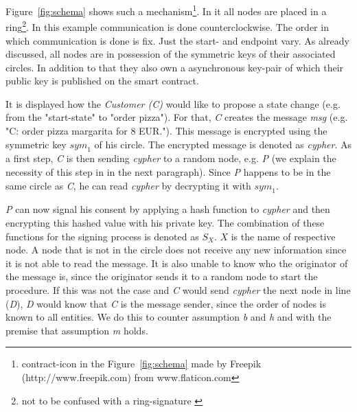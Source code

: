 \documentclass[runningheads]{llncs}
\newcommand{\comment}[1]{}
\newcommand{\ber}[1]{\textit{#1}}
\newcommand{\reffig}[1]{Figure~\ref{#1}}
\begin{document}
\reffig{fig:schema} shows such a mechanism\footnote{contract-icon in the \reffig{fig:schema} made by Freepik (http://www.freepik.com) from www.flaticon.com}. In it all nodes are placed in a ring\footnote{not to be confused with a ring-signature \cite{rivest2001leak}}. In this example communication is done counterclockwise. The order in which communication is done is fix. Just the start- and endpoint vary. As already discussed, all nodes are in possession of the symmetric keys of their associated circles. In addition to that they also own a asynchronous key-pair of which their public key is published on the smart contract.

It is displayed how the \ber{Customer (C)} would like to propose a state change (e.g. from the "start-state" to "order pizza"). For that, \ber{C} creates the message \ber{msg} (e.g. "C: order pizza margarita for 8 EUR."). This message is encrypted using the symmetric key ${sym}_1$ of his circle. The encrypted message is denoted as \ber{cypher}. As a first step, \ber{C} is then sending \ber{cypher} to a random node, e.g. \ber{P} (we explain the necessity of this step in in the next paragraph). Since \ber{P} happens to be in the same circle as \ber{C}, he can read \ber{cypher} by decrypting it with ${sym}_1$. 



\ber{P} can now signal his consent by applying a hash function to \ber{cypher} and then encrypting this hashed value with his private key. The combination of these functions for the signing process is denoted as $S_X$. $X$ is the name of respective node. A node that is not in the circle does not receive any new information since it is not able to read the message. It is also unable to know who the originator of the message is, since the originator sends it to a random node to start the procedure. If this was not the case and \ber{C} would send \ber{cypher} the next node in line (\ber{D}), \ber{D} would know that \ber{C} is the message sender, since the order of nodes is known to all entities. We do this to counter assumption \ber{b} and \ber{h} and with the premise that assumption \ber{m} holds.

\comment{
Furthermore, a node will also not be able to know how many other nodes already "agreed" to the message, because we "nest" signatures instead of just appending them to a list. This way it is impossible to simply count the number of signatures, send together with \ber{cypher}. We do all of this to counter assumption \ber{b} and \ber{h} and with the premise that assumption \ber{m} holds.
}
\end{document}
